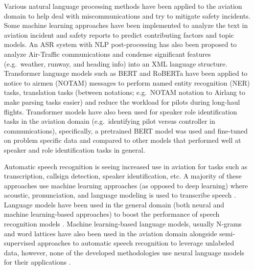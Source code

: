 \documentclass[12pt]{article}
\begin{document}
Various natural language processing methods have been applied to the aviation domain to help deal with miscommunications
and try to mitigate safety incidents\cite{ragnarsdottir_language_2003,tanguy_natural_2016,madeira_machine_2021}.
Some machine learning approaches have been implemented to analyze the text in aviation incident and safety reports to predict
contributing factors and topic models\cite{tanguy_natural_2016,madeira_machine_2021}. An ASR system with NLP post-processing
has also been proposed to analyze Air-Traffic communications and condense significant features (e.g.~weather, runway, and
heading info) into an XML language structure\cite{ragnarsdottir_language_2003}. Transformer language models such as BERT and RoBERTa have been applied
to notice to airmen (NOTAM) messages to perform named entity recognition (NER) tasks, translation tasks (between notations; e.g.~NOTAM notation to
Airlang to make parsing tasks easier) and reduce the workload for pilots during long-haul flights\cite{arnold_knowledge_2022}. Transformer models
have also been used for speaker role identification tasks in the aviation domain (e.g.~identifying pilot versus controller in communications),
specifically, a pretrained BERT model was used and fine-tuned on problem specific data and compared to other models that performed well at speaker
and role identification tasks in general\cite{guo_comparative_2022}.

Automatic speech recognition is seeing increased use in aviation for tasks such as transcription, callsign detection, speaker identification,
etc. A majority of these approaches use machine learning approaches (as opposed to deep learning) where acoustic, pronunciation, and language
modeling is used to transcribe speech
\cite{guo_comparative_2022,smidl_air_2019,zuluaga-gomez_automatic_2020,badrinath_automatic_2022,hofbauer_atcosim_2008,helmke_quantifying_2017}.
Language models have been used in the general domain (both neural and machine learning-based approaches) to boost the performance of speech
recognition models \cite{han_contextnet_2020,kriman_quartznet_2020,majumdar_citrinet_2021}. Machine learning-based language models, usually N-grams
and word lattices have also been used in the aviation domain alongside semi-supervised approaches to automatic speech recognition to leverage
unlabeled data, however, none of the developed methodologies use neural language models for their applications
\cite{zuluaga-gomez_contextual_2021,srinivasamurthy_semi-supervised_2017,badrinath_automatic_2022}.
\end{document}
